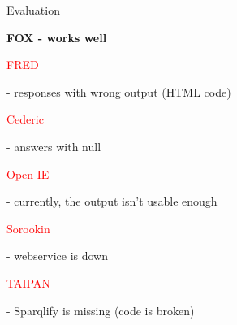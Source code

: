 \begin{frame}{Evaluation}
	\begin{itemize}
		\item \textbf{FOX - works well}
		\textcolor{red}{\item FRED} - responses with wrong output (HTML code)
			\textcolor{red}{\item Cederic} - answers with null
			\textcolor{red}{\item Open-IE} - currently, the output isn't usable enough
			\textcolor{red}{\item Sorookin} - webservice is down
			\textcolor{red}{\item TAIPAN} - Sparqlify is missing (code is broken)
	\end{itemize}

\end{frame}